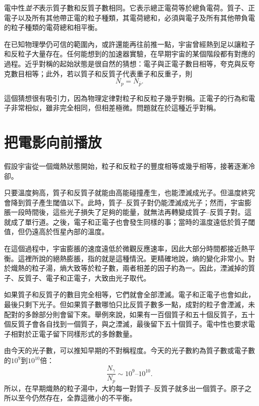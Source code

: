 電中性\emph{並不}表示質子數和反質子數相同。它表示總正電荷等於總負電荷。質子、正電子以及所有其他帶正電的粒子種類，其電荷總和，必須與電子及所有其他帶負電的粒子種類的電荷總和相平衡。

在已知物理學仍可信的範圍內，或許還能再往前推一點，宇宙曾經熱到足以讓粒子和反粒子大量存在。任何能想到的加速器實驗，在早期宇宙的某個階段都有對應的過程。近乎對稱的起始狀態是很自然的猜想：電子與正電子數目相等，夸克與反夸克數目相等；此外，若以質子和反質子代表重子和反重子，則
\[
N_p = N_{\bar p}.
\]

這個猜想很有吸引力，因為物理定律對粒子和反粒子幾乎對稱。正電子的行為和電子非常相似，雖非完全相同，但相差極微。問題就在於這種近乎對稱。

\section{把電影向前播放}

假設宇宙從一個熾熱狀態開始，粒子和反粒子的豐度相等或幾乎相等，接著逐漸冷卻。

只要溫度夠高，質子和反質子就能由高能碰撞產生，也能湮滅成光子。但溫度終究會降到質子產生閾值以下。此時，質子--反質子對仍能湮滅成光子；然而，宇宙膨脹一段時間後，這些光子損失了足夠的能量，就無法再轉變成質子--反質子對。這就成了單行道。之後，電子和正電子也會發生同樣的事；當時的溫度遠低於質子閾值，但仍遠高於恆星內部的溫度。

在這個過程中，宇宙膨脹的速度遠低於微觀反應速率，因此大部分時間都接近熱平衡。這裡所說的絕熱膨脹，指的就是這種情況。更精確地說，熵的變化非常小。對於熾熱的粒子湯，熵大致等於粒子數，兩者相差的因子約為一。因此，湮滅掉的質子、反質子、電子和正電子，大致由光子取代。

如果質子和反質子的數目完全相等，它們就會全部湮滅。電子和正電子也會如此，最後只剩下光子。但如果質子數哪怕只比反質子數多一點，成對的粒子會湮滅，未配對的多餘部分則會留下來。舉例來說，如果有一百個質子和五十個反質子，五十個反質子會各自找到一個質子，與之湮滅，最後留下五十個質子。電中性也要求電子相對於正電子留下同樣形式的多餘數量。

由今天的光子數，可以推知早期的不對稱程度。今天的光子數約為質子數或電子數的\(10^9\)到\(10^{10}\)倍：
\[
\frac{N_\gamma}{N_p} \sim 10^9\text{--}10^{10}.
\]
所以，在早期熾熱的粒子湯中，大約每一對質子--反質子就多出一個質子。原子之所以至今仍然存在，全靠這微小的不平衡。

\begin{classroomqa}
\end{classroomqa}

